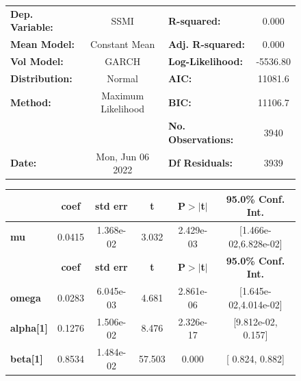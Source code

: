 \documentclass[a4paper, oneside]{discothesis}
\begin{document}
\begin{figure}

\begin{multicols}{2}
{\fontsize{2.5}{4}\selectfont
  
\begin{center}
\begin{tabular}{lclc}
\toprule
\textbf{Dep. Variable:} &        SSMI        & \textbf{  R-squared:         } &     0.000   \\
\textbf{Mean Model:}    &   Constant Mean    & \textbf{  Adj. R-squared:    } &     0.000   \\
\textbf{Vol Model:}     &       GARCH        & \textbf{  Log-Likelihood:    } &   -5536.80  \\
\textbf{Distribution:}  &       Normal       & \textbf{  AIC:               } &    11081.6  \\
\textbf{Method:}        & Maximum Likelihood & \textbf{  BIC:               } &    11106.7  \\
\textbf{}               &                    & \textbf{  No. Observations:  } &    3940     \\
\textbf{Date:}          &  Mon, Jun 06 2022  & \textbf{  Df Residuals:      } &    3939     \\
\bottomrule
\end{tabular}
\begin{tabular}{lccccc}
            & \textbf{coef} & \textbf{std err} & \textbf{t} & \textbf{P$> |$t$|$} & \textbf{95.0\% Conf. Int.}  \\
\midrule
\textbf{mu} &       0.0415  &    1.368e-02     &     3.032  &      2.429e-03       &   [1.466e-02,6.828e-02]     \\
                  & \textbf{coef} & \textbf{std err} & \textbf{t} & \textbf{P$> |$t$|$} & \textbf{95.0\% Conf. Int.}  \\
\midrule
\textbf{omega}    &       0.0283  &    6.045e-03     &     4.681  &      2.861e-06       &   [1.645e-02,4.014e-02]     \\
\textbf{alpha[1]} &       0.1276  &    1.506e-02     &     8.476  &      2.326e-17       &    [9.812e-02,  0.157]      \\
\textbf{beta[1]}  &       0.8534  &    1.484e-02     &    57.503  &        0.000         &     [  0.824,  0.882]       \\
\bottomrule
\end{tabular}
\end{center}

}
\end{multicols}
\end{figure}
\end{document}
